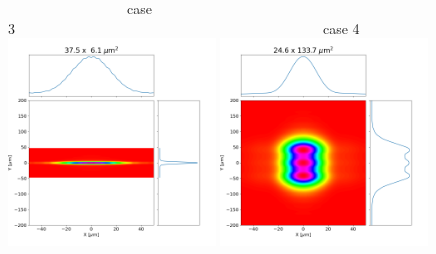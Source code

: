 \documentclass[]{article}
\begin{document}
\begin{figure}
    ~~~~~~~~~~~~~~~~~case 3~~~~~~~~~~~~~~~~~~~~~~~~~~~~~~~~~~~~~~~~~~~~case 4\\
    \includegraphics[width=0.49\textwidth]{figures/case3_wofry_ws_results.png}
    \includegraphics[width=0.49\textwidth]{figures/case4_wofry_ws_results.png}

\end{figure}
\end{document}
